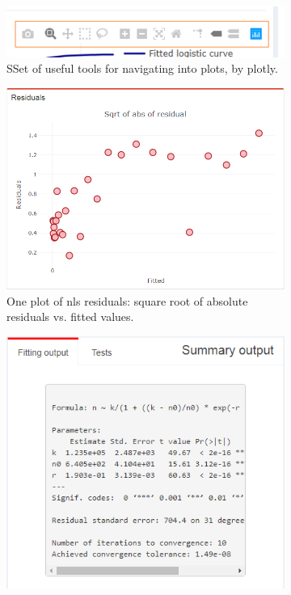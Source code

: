 \documentclass[
12pt, %
a4paper, %
oneside, %
headinclude,footinclude, %
BCOR5mm, %
]{scrartcl}
\begin{document}
\begin{figure}[H]
  \centering
\begin{subfigure}{0.6\textwidth}
  \includegraphics[width=1\linewidth]{Figures/logistic_plot3.png} 
  \caption{SSet of useful tools for navigating into plots, by plotly.}
  \label{fig:logistic_plot3}
\end{subfigure} 
\hspace{5.5cm}
\begin{subfigure}{0.6\textwidth}
  \includegraphics[width=1\linewidth]{Figures/logistic_res1.png} 
  \caption{One plot of nls residuals: square root of absolute residuals vs. fitted values.}
  \label{fig:logistic_res1}
\end{subfigure} 
\hspace{5.5cm}
\begin{subfigure}{0.6\textwidth}
  \includegraphics[width=1\linewidth]{Figures/logistic_smry1.png} 

\end{subfigure}
\end{figure}
\end{document}
